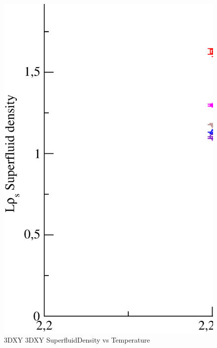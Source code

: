 \begin{figure}[!htpb]
  \centering
  \includegraphics[width=\textwidth]{./plots/3DXY/3DXY_SuperfluidDensity_vs_Temperature.eps}
  \caption{3DXY 3DXY SuperfluidDensity vs Temperature}
\end{figure}

